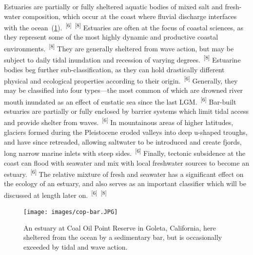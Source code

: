 \documentclass{article}
\begin{document}

\par{Estuaries are partially or fully sheltered aquatic bodies of mixed salt and fresh-water composition, which occur at the coast where fluvial discharge interfaces with the ocean~(\cref{figure11}).~\textsuperscript{[6]}~\textsuperscript{[8]} Estuaries are often at the focus of coastal sciences, as they represent some of the most highly dynamic and productive coastal environments.~\textsuperscript{[8]} They are generally sheltered from wave action, but may be subject to daily tidal inundation and recession of varying degrees.~\textsuperscript{[8]} Estuarine bodies beg further sub-classification, as they can hold drastically different physical and ecological properties according to their origin.~\textsuperscript{[6]} Generally, they may be classified into four types---the most common of which are drowned river mouth inundated as an effect of eustatic sea since the last LGM.~\textsuperscript{[6]} Bar-built estuaries are partially or fully enclosed by barrier systems which limit tidal access and provide shelter from waves.~\textsuperscript{[6]} In mountainous areas of higher latitudes, glaciers formed during the Pleistocene eroded valleys into deep u-shaped troughs, and have since retreaded, allowing saltwater to be introduced and create fjords, long narrow marine inlets with steep sides.~\textsuperscript{[6]} Finally, tectonic subsidence at the coast can flood with seawater and mix with local freshwater sources to become an estuary.~\textsuperscript{[6]} The relative mixture of fresh and seawater has a significant effect on the ecology of an estuary, and also serves as an important classifier which will be discussed at length later on.~\textsuperscript{[6]}~\textsuperscript{[8]}}


\begin{figure}
    \centering
    \texttt{[image: images/cop-bar.JPG]}
    \caption{An estuary at Coal Oil Point Reserve in Goleta, California, here sheltered from the ocean by a sedimentary bar, but is occasionally exceeded by tidal and wave action.}
    \label{figure11}
\end{figure}

\end{document}
